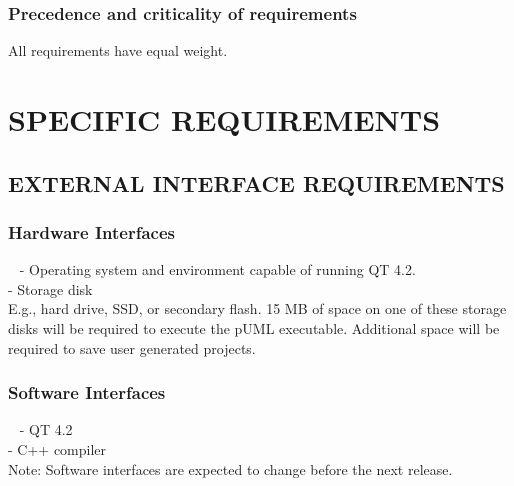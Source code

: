 \documentclass[twoside,letterpaper]{article}
\begin{document}
\subsubsection[Precedence and criticality of requirements]{\rmfamily\bfseries\color{black}
Precedence and criticality of requirements}
{\color{black}
All requirements have equal weight.}












\clearpage\section[SPECIFIC REQUIREMENTS]{\rmfamily\bfseries\color{black}
SPECIFIC REQUIREMENTS}

\subsection[EXTERNAL INTERFACE REQUIREMENTS]{\rmfamily\bfseries\color{black}
EXTERNAL INTERFACE REQUIREMENTS}

\subsubsection[Hardware Interfaces]{\rmfamily\bfseries\color{black}
Hardware Interfaces}
{\color{black}
\foreignlanguage{english}{\ }\foreignlanguage{english}
{
- Operating system and environment capable of running QT 4.2.
\\- Storage disk
\\  E.g., hard drive, SSD, or secondary flash. 15 MB of space on one of these storage disks will be required
to execute the pUML executable. Additional space will be required to save user generated projects.}}

\subsubsection[Software Interfaces]{\rmfamily\bfseries\color{black}
Software Interfaces}
{\color{black} \foreignlanguage{english}{\ }\foreignlanguage{english}
{
- QT 4.2
\\- C++ compiler
\\  Note: Software interfaces are expected to change before the next release.
}}
\end{document}
